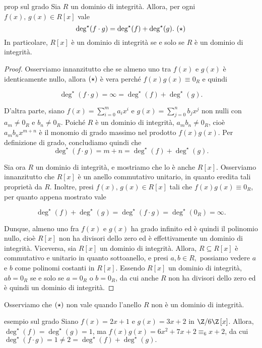 \begin{prop}[]{prop sul grado}
Sia $R$ un dominio di integrità. Allora, per ogni $f(x),\,g(x)\in R[x]$ vale \[\deg^{\star}(f\cdot g)=\deg^{\star}(f)+\deg^{\star}(g). \ \bf{(\star)}\] In particolare, $R[x]$ è un dominio di integrità se e solo se $R$ è un dominio di integrità.
\end{prop}
\vspace{-4mm}
\begin{proof} Osserviamo innanzitutto che se almeno uno tra $f(x)$ e $g(x)$ è identicamente nullo, 
allora $\bf{(\star)}$ è vera perché $f(x)g(x)\equiv 0_R$ e quindi 

\[\deg^{\star}(f\cdot g)=\infty=\deg^{\star}(f)+\deg^{\star}(g).\] 

\noindent D'altra parte, siano $f(x)=\sum\limits_{i=0}^m a_i x^i$ e $g(x)=\sum\limits_{j=0}^n b_j x^j$ 
non nulli con $a_m\neq 0_R$ e $b_n\neq 0_R$. Poiché $R$ è un dominio di integrità, $a_m b_n\neq 0_R$, 
cioè $a_m b_n x^{m+n}$ è il monomio di grado massimo nel prodotto $f(x)g(x)$. Per definizione di grado, 
concludiamo quindi che \[\deg^{\star}(f\cdot g)=m+n=\deg^{\star}(f)+\deg^{\star}(g).\]

\noindent Sia ora $R$ un dominio di integrità, e mostriamo che lo è anche $R[x]$. 
Osserviamo innanzitutto che $R[x]$ è un anello commutativo unitario, in quanto eredita tali proprietà da $R$. 
Inoltre, presi $f(x),\,g(x)\in R[x]$ tali che $f(x)g(x)\equiv 0_R$, per quanto appena mostrato vale 

\[\deg^{\star}(f)+\deg^{\star}(g)=\deg^{\star}(f\cdot g)=\deg^{\star}(0_R)=\infty.\] 

\noindent Dunque, almeno uno fra $f(x)$ e $g(x)$ ha grado infinito ed è quindi il polinomio nullo, 
cioè $R[x]$ non ha divisori dello zero ed è effettivamente un dominio di integrità.
\vspace{1mm}
\noindent Viceversa, sia $R[x]$ un dominio di integrità. Allora, $R\subseteq R[x]$ è commutativo e unitario in quanto sottoanello, 
e presi $a,b\in R,$ possiamo vedere $a$ e $b$ come polinomi costanti in $R[x]$. Essendo $R[x]$ un dominio di integrità, 
$ab=0_R$ se e solo se $a=0_R$ o $b=0_R$, da cui anche $R$ non ha divisori dello zero ed è quindi un dominio di integrità.
\end{proof}

\noindent Osserviamo che $\bf{(\star)}$ non vale quando l'anello $R$ non è un dominio di integrità.

\begin{example}[]{esempio sul grado}
Siano $f(x)=2x+1$ e $g(x)=3x+2$ in $\Z/6\Z\,[x]$. Allora, $\deg^{\star}(f)=\deg^{\star}(g)=1$, 
ma $f(x)g(x)=6x^2+7x+2\equiv_6 x+2$, da cui $\deg^{\star}(f\cdot g)=1\neq 2=\deg^{\star}(f)+\deg^{\star}(g).$
\end{example}

